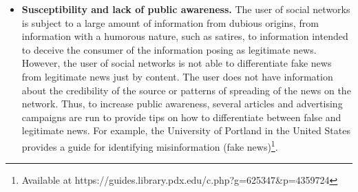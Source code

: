 \documentclass{ieeeaccess}
\begin{document}
\begin{itemize}


\item{\bf Susceptibility and lack of public awareness.} The user of social networks is subject to a large amount of information from dubious origins, from information with a humorous nature, such as satires, to information intended to deceive the consumer of the information posing as legitimate news. However, the user of social networks is not able to differentiate fake news from legitimate news just by content. The user does not have information about the credibility of the source or patterns of spreading of the news on the network. Thus, to increase public awareness, several articles and advertising campaigns are run to provide tips on how to differentiate between false and legitimate news. For example, the University of Portland in the United States provides a guide for identifying misinformation (fake news)\footnote{Available at https://guides.library.pdx.edu/c.php?g=625347\&p=4359724}.



\end{itemize}
\end{document}
